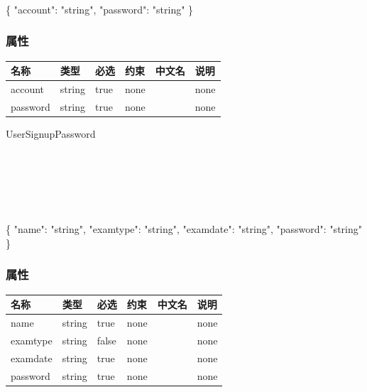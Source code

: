 \documentclass[
]{article}
\newenvironment{Shaded}{}{}
\newcommand{\DataTypeTok}[1]{\textcolor[rgb]{0.56,0.13,0.00}{#1}}
\newcommand{\FunctionTok}[1]{\textcolor[rgb]{0.02,0.16,0.49}{#1}}
\newcommand{\StringTok}[1]{\textcolor[rgb]{0.25,0.44,0.63}{#1}}
\begin{document}
\strut \\
\strut \\
\strut \\

\begin{Shaded}
\begin{Highlighting}[]
\FunctionTok{\{}
  \DataTypeTok{"account"}\FunctionTok{:} \StringTok{"string"}\FunctionTok{,}
  \DataTypeTok{"password"}\FunctionTok{:} \StringTok{"string"}
\FunctionTok{\}}
\end{Highlighting}
\end{Shaded}

\hypertarget{ux5c5eux6027-13}{%
\subsubsection{属性}\label{ux5c5eux6027-13}}

\begin{longtable}[]{@{}llllll@{}}
\toprule
名称 & 类型 & 必选 & 约束 & 中文名 & 说明 \\
\midrule
\endhead
account & string & true & none & & none \\
password & string & true & none & & none \\
\bottomrule
\end{longtable}

UserSignupPassword

\strut \\
\strut \\
\strut \\

\begin{Shaded}
\begin{Highlighting}[]
\FunctionTok{\{}
  \DataTypeTok{"name"}\FunctionTok{:} \StringTok{"string"}\FunctionTok{,}
  \DataTypeTok{"examtype"}\FunctionTok{:} \StringTok{"string"}\FunctionTok{,}
  \DataTypeTok{"examdate"}\FunctionTok{:} \StringTok{"string"}\FunctionTok{,}
  \DataTypeTok{"password"}\FunctionTok{:} \StringTok{"string"}
\FunctionTok{\}}
\end{Highlighting}
\end{Shaded}

\hypertarget{ux5c5eux6027-14}{%
\subsubsection{属性}\label{ux5c5eux6027-14}}

\begin{longtable}[]{@{}llllll@{}}
\toprule
名称 & 类型 & 必选 & 约束 & 中文名 & 说明 \\
\midrule
\endhead
name & string & true & none & & none \\
examtype & string & false & none & & none \\
examdate & string & true & none & & none \\
password & string & true & none & & none \\
\bottomrule
\end{longtable}
\end{document}
